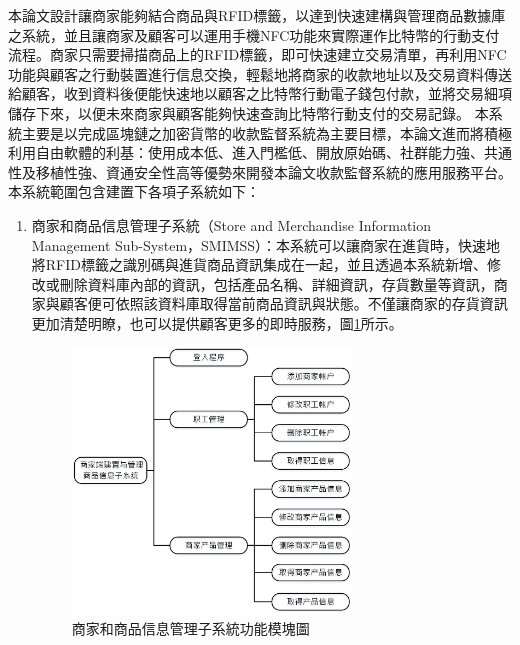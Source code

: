 	本論文設計讓商家能夠結合商品與RFID標籤，以達到快速建構與管理商品數據庫之系統，並且讓商家及顧客可以運用手機NFC功能來實際運作比特幣的行動支付流程。商家只需要掃描商品上的RFID標籤，即可快速建立交易清單，再利用NFC功能與顧客之行動裝置進行信息交換，輕鬆地將商家的收款地址以及交易資料傳送給顧客，收到資料後便能快速地以顧客之比特幣行動電子錢包付款，並將交易細項儲存下來，以便未來商家與顧客能夠快速查詢比特幣行動支付的交易記錄。
	本系統主要是以完成區塊鏈之加密貨幣的收款監督系統為主要目標，本論文進而將積極利用自由軟體的利基：使用成本低、進入門檻低、開放原始碼、社群能力強、共通性及移植性強、資通安全性高等優勢來開發本論文收款監督系統的應用服務平台。本系統範圍包含建置下各項子系統如下：
		\begin{enumerate}
		\item 商家和商品信息管理子系統（Store and Merchandise Information Management Sub-System，SMIMSS）：本系統可以讓商家在進貨時，快速地將RFID標籤之識別碼與進貨商品資訊集成在一起，並且透過本系統新增、修改或刪除資料庫內部的資訊，包括產品名稱、詳細資訊，存貨數量等資訊，商家與顧客便可依照該資料庫取得當前商品資訊與狀態。不僅讓商家的存貨資訊更加清楚明瞭，也可以提供顧客更多的即時服務，圖\ref{model1}所示。

			\begin{figure}[!htbp]
			\centering
			\includegraphics[width = 0.7\textwidth]{model1.jpg}
			\caption{商家和商品信息管理子系統功能模塊圖}\label{model1}
			\end{figure}




\end{enumerate}
